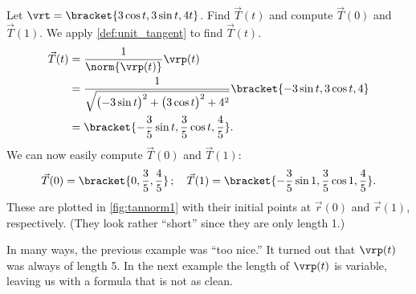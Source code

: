 \begin{example}\label{ex_tannorm1}
Let $\vrt =\bracket{3\cos t, 3\sin t, 4t}$. Find $\vec T(t)$ and compute $\vec T(0)$ and $\vec T(1)$.
\solution
We apply \autoref{def:unit_tangent} to find $\vec T(t)$. 
\begin{align*}
\vec T(t) &= \frac1{\norm{\vrp(t)}}\vrp(t) \\
				&=\frac{1}{\sqrt{\bigl(-3\sin t\bigr)^2+\bigl(3\cos t\bigr)^2+ 4^2}}\bracket{-3\sin t,3\cos t, 4}\\
				&=\bracket{-\frac35\sin t,\frac35\cos t,\frac45}.
\end{align*}
We can now easily compute $\vec T(0)$ and $\vec T(1)$:
%
%
\[
\vec T(0) =\bracket{0,\frac35,\frac45}\,;\quad \vec T(1) =\bracket{-\frac35\sin 1,\frac35\cos 1,\frac45}%
.
\]
These are plotted in \autoref{fig:tannorm1} with their initial points at $\vec r(0)$ and $\vec r(1)$, respectively. (They look rather ``short'' since they are only length 1.)
%
\end{example}

In many ways, the previous example was ``too nice.'' It turned out that $\vrp(t)$ was always of length 5. In the next example the length of $\vrp(t)$ is variable, leaving us with a formula that is not as clean.

